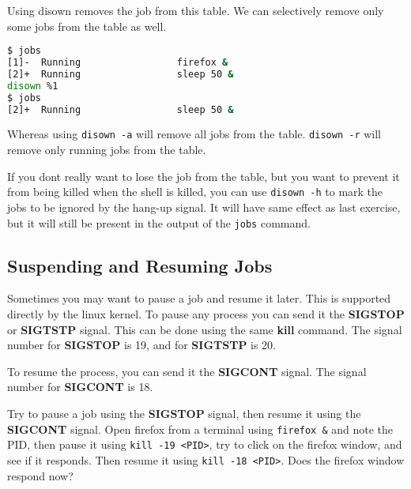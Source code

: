Using disown removes the job from this table. We can selectively
remove only some jobs from the table as well.

\begin{lstlisting}[language=bash]
$ jobs
[1]-  Running                 firefox &
[2]+  Running                 sleep 50 &
disown %1
$ jobs
[2]+  Running                 sleep 50 &
\end{lstlisting}

Whereas using \texttt{disown -a} will remove all jobs from the table.
\texttt{disown -r} will remove only running jobs from the table.

If you dont really want to lose the job from the table, but you want to
prevent it from being killed when the shell is killed, you can use
\texttt{disown -h} to mark the jobs to be ignored by the hang-up signal.
It will have same effect as last exercise, but it will still be present
in the output of the \texttt{jobs} command.

\subsection{Suspending and Resuming Jobs}

Sometimes you may want to pause a job and resume it later.
This is supported directly by the linux kernel.
To pause any process you can send it the \textbf{SIGSTOP} or \textbf{SIGTSTP} signal.
This can be done using the same \textbf{kill} command. The signal number for
\textbf{SIGSTOP} is 19, and for \textbf{SIGTSTP} is 20.

To resume the process, you can send it the \textbf{SIGCONT} signal.
The signal number for \textbf{SIGCONT} is 18.

\begin{exercise}
  Try to pause a job using the \textbf{SIGSTOP} signal, then resume it using the
  \textbf{SIGCONT} signal.
  Open firefox from a terminal using \texttt{firefox \&} and note the PID,
  then pause it using
  \texttt{kill -19 <PID>},
  try to click on the firefox window, and see if it responds.
  Then resume it using \texttt{kill -18 <PID>}.
  Does the firefox window respond now?
\end{exercise}

